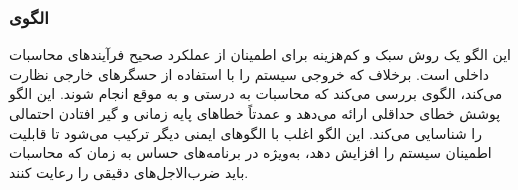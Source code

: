 \subsubsection{الگوی }
\label{archSafeWatchDogSec}
\begin{RTL}
این الگو \cite{ref4}
یک روش سبک و کم‌هزینه برای اطمینان از عملکرد صحیح فرآیندهای
محاسبات داخلی است. برخلاف 
که خروجی سیستم را با استفاده از حسگرهای خارجی نظارت می‌کند،
الگوی  بررسی می‌کند که محاسبات
به درستی و به موقع انجام شوند. این الگو پوشش خطای حداقلی ارائه می‌دهد
و عمدتاً خطاهای پایه زمانی و گیر افتادن احتمالی را شناسایی می‌کند.
این الگو اغلب با الگوهای ایمنی دیگر ترکیب می‌شود تا قابلیت اطمینان سیستم
را افزایش دهد، به‌ویژه در برنامه‌های حساس به زمان که محاسبات
باید ضرب‌الاجل‌های دقیقی را رعایت کنند.
\end{RTL}